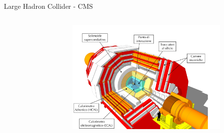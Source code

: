 \documentclass{beamer}
\begin{document}
\begin{frame}{Large Hadron Collider - CMS}
\begin{columns}
\begin{figure}
      \end{figure}
      \vspace{-1ex}
      \begin{figure}
        \includegraphics[width=\textwidth]{./Images/cms_cutaway-flat.pdf}
      \end{figure}
      \begin{flushright}
        \vspace{-3.3ex}
      \end{flushright}
    \end{columns}
%
\end{frame}
\end{document}
